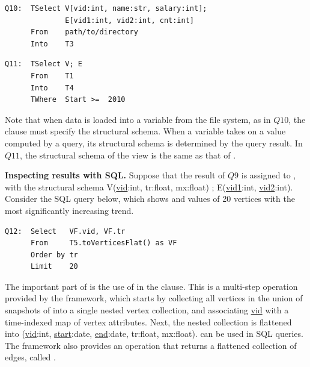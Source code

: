 \begin{small}
\begin{verbatim}
Q10:  TSelect V[vid:int, name:str, salary:int]; 
              E[vid1:int, vid2:int, cnt:int]
      From    path/to/directory
      Into    T3
\end{verbatim}
\end{small}

\begin{small}
\begin{verbatim}
Q11:  TSelect V; E
      From    T1
      Into    T4
      TWhere  Start >=  2010 
\end{verbatim}
\end{small}

Note that when data is loaded into a \tg variable from the file
system, as in $Q10$, the  clause must specify the
structural schema.  When a \tg variable takes on a value computed by a
query, its structural schema is determined by the query result.  In
$Q11$, the structural schema of the view  is the same as
that of .

{\bf Inspecting results with SQL.}  Suppose that the result of $Q9$ is
assigned to , with the structural schema
V(\underline{vid}:int, tr:float, mx:float) ; E(\underline{vid1}:int,
\underline{vid2}:int).  Consider the SQL query below, which shows
 and  values of 20 vertices with the most
significantly increasing  trend. 

\begin{small}
\begin{verbatim}
Q12:  Select   VF.vid, VF.tr  
      From     T5.toVerticesFlat() as VF
      Order by tr
      Limit    20
\end{verbatim}
\end{small}

The important part of  is the use of
 in the  clause.  This is a
multi-step operation provided by the \ql framework, which starts by
collecting all vertices in the union of snapshots of  into a
single nested vertex collection, and associating \underline{vid} with
a time-indexed map of vertex attributes.  Next, the nested collection
is flattened into  (\underline{vid}:int,
\underline{start}:date, \underline{end}:date, tr:float, mx:float).
 can be used in SQL queries.  The \ql framework also
provides an operation that returns a flattened collection of edges,
called .



